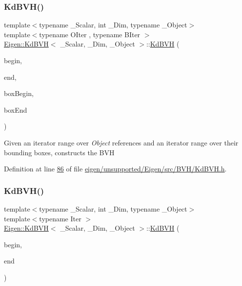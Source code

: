 \subsubsection{\texorpdfstring{Kd\+B\+V\+H()}{KdBVH()}\hspace{0.1cm}{\footnotesize\ttfamily [2/4]}}
{\footnotesize\ttfamily template$<$typename \+\_\+\+Scalar, int \+\_\+\+Dim, typename \+\_\+\+Object$>$ \\
template$<$typename O\+Iter , typename B\+Iter $>$ \\
\hyperlink{class_eigen_1_1_kd_b_v_h}{Eigen\+::\+Kd\+B\+VH}$<$ \+\_\+\+Scalar, \+\_\+\+Dim, \+\_\+\+Object $>$\+::\hyperlink{class_eigen_1_1_kd_b_v_h}{Kd\+B\+VH} (\begin{DoxyParamCaption}\item[{O\+Iter}]{begin,  }\item[{O\+Iter}]{end,  }\item[{B\+Iter}]{box\+Begin,  }\item[{B\+Iter}]{box\+End }\end{DoxyParamCaption})\hspace{0.3cm}{\ttfamily [inline]}}

Given an iterator range over {\itshape Object} references and an iterator range over their bounding boxes, constructs the B\+VH 

Definition at line \hyperlink{eigen_2unsupported_2_eigen_2src_2_b_v_h_2_kd_b_v_h_8h_source_l00086}{86} of file \hyperlink{eigen_2unsupported_2_eigen_2src_2_b_v_h_2_kd_b_v_h_8h_source}{eigen/unsupported/\+Eigen/src/\+B\+V\+H/\+Kd\+B\+V\+H.\+h}.

\mbox{\label{class_eigen_1_1_kd_b_v_h_a87d240e2d6ac5e87fc2e4ae6e0fe4bdc}} 
\subsubsection{\texorpdfstring{Kd\+B\+V\+H()}{KdBVH()}\hspace{0.1cm}{\footnotesize\ttfamily [3/4]}}
{\footnotesize\ttfamily template$<$typename \+\_\+\+Scalar, int \+\_\+\+Dim, typename \+\_\+\+Object$>$ \\
template$<$typename Iter $>$ \\
\hyperlink{class_eigen_1_1_kd_b_v_h}{Eigen\+::\+Kd\+B\+VH}$<$ \+\_\+\+Scalar, \+\_\+\+Dim, \+\_\+\+Object $>$\+::\hyperlink{class_eigen_1_1_kd_b_v_h}{Kd\+B\+VH} (\begin{DoxyParamCaption}\item[{Iter}]{begin,  }\item[{Iter}]{end }\end{DoxyParamCaption})\hspace{0.3cm}{\ttfamily [inline]}}

